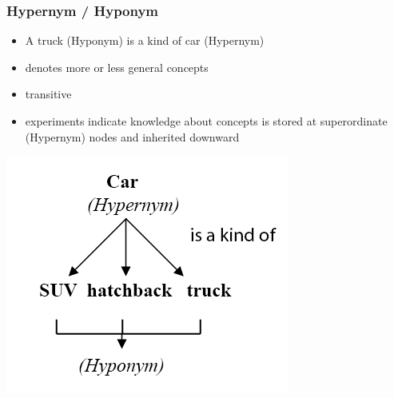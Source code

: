 \begin{frame}
\frametitle{Hypernym / Hyponym}
\begin{minipage}{0.5\textwidth}
\begin{itemize}
\item A truck (Hyponym) is a kind of car (Hypernym)
\item denotes more or less general concepts
\item transitive
\item experiments indicate knowledge about concepts is stored at superordinate (Hypernym) nodes and inherited downward
\end{itemize}
\end{minipage}
\begin{minipage}{0.4\textwidth}
\includegraphics[scale=0.33]{img/wordnet_hyp.png}
\end{minipage}
\end{frame}

